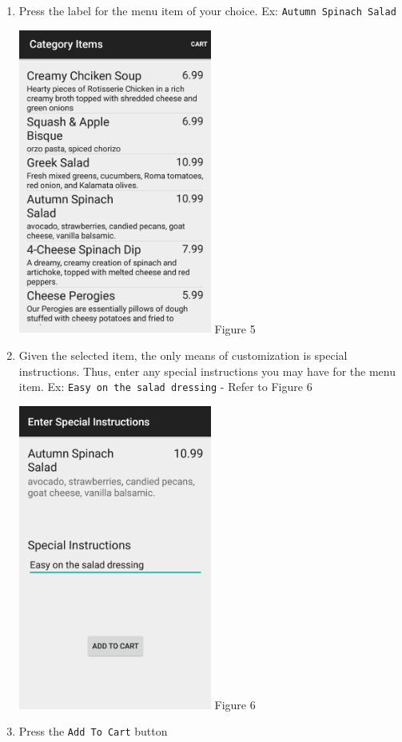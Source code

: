 \documentclass[12pt, titlepage]{article}
\begin{document}
\begin{enumerate}
		\item Press the label for the menu item of your choice. Ex: 					\texttt{Autumn Spinach Salad}
		\begin{center}
			\includegraphics[width=0.5\textwidth]{appetizers.png}
			\linebreak Figure 5
		\end{center}				
		
		\item Given the selected item, the only means of customization is special instructions. Thus, enter any special instructions you may have for the menu 					item. Ex: \texttt{Easy on the salad dressing} - Refer to Figure 			6
		\begin{center}
			\includegraphics[width=0.5\textwidth]{special-instructions.png}
			\linebreak Figure 6
		\end{center}		
	
		\item Press the \texttt{Add To Cart} button
	\end{enumerate}
\end{document}
